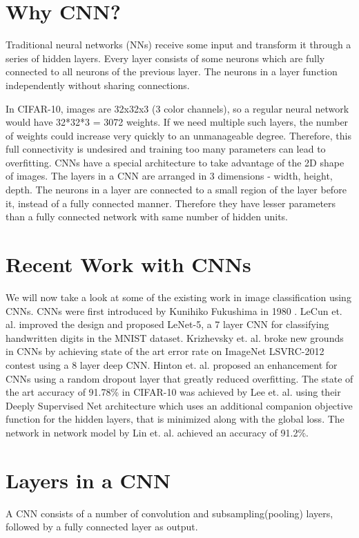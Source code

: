 \documentclass[10pt,twocolumn,letterpaper]{article}
\begin{document}
\section{Why CNN?}
Traditional neural networks (NNs) receive some input and transform it through a series of hidden layers. Every layer consists of some neurons which are fully connected to all neurons of the previous layer. The neurons in a layer function independently without sharing connections.

In CIFAR-10, images are 32x32x3 (3 color channels), so a regular neural network would have 32*32*3 = 3072 weights. If we need multiple such layers, the number of weights could increase very quickly to an unmanageable degree. Therefore, this full connectivity is undesired and training too many parameters can lead to overfitting. CNNs have a special architecture to take advantage of the 2D shape of images. The layers in a CNN are arranged in 3 dimensions - width, height, depth. The neurons in a layer are connected to a small region of the layer before it, instead of a fully connected manner. Therefore they have lesser parameters than a fully connected network with same number of hidden units.

\section{Recent Work with CNNs}
We will now take a look at some of the existing work in image classification using CNNs. CNNs were first introduced by Kunihiko Fukushima in 1980 \cite{fukushima1980neocognitron}. LeCun et. al. \cite{lecun1998gradient} improved the design and proposed LeNet-5, a 7 layer CNN for classifying handwritten digits in the MNIST dataset. Krizhevsky et. al. \cite{krizhevsky2012imagenet} broke new grounds in CNNs by achieving state of the art error rate on ImageNet LSVRC-2012 contest using a 8 layer deep CNN. Hinton et. al. \cite{hinton2012improving} proposed an enhancement for CNNs using a random dropout layer that greatly reduced overfitting.
	The state of the art accuracy of 91.78\% in CIFAR-10 was achieved by Lee et. al. \cite{lee2014deeply} using their Deeply Supervised Net architecture which uses an additional companion objective function for the hidden layers, that is minimized along with the global loss. The network in network model by Lin et. al. \cite{DBLP:journals/corr/LinCY13} achieved an accuracy of 91.2\%.


\section{Layers in a CNN}
A CNN consists of a number of convolution and subsampling(pooling) layers, followed by a fully connected layer as output. 
\end{document}
